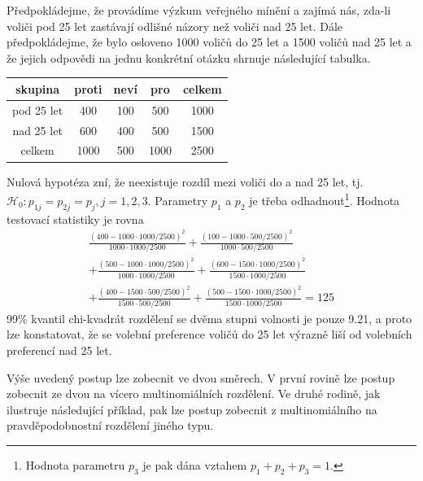 \begin{example}
Předpokládejme, že provádíme výzkum veřejného mínění a zajímá nás, zda-li voliči pod 25 let zastávají odlišné názory než voliči nad 25 let. Dále předpokládejme, že bylo osloveno 1000 voličů do 25 let a 1500 voličů nad 25 let a že jejich odpovědi na jednu konkrétní otázku shrnuje následující tabulka.
\begin{center}
  \begin{tabular}{|c|c|c|c|c|}
    \hline
    \textbf{skupina} & \textbf{proti} & \textbf{neví} & \textbf{pro} & \textbf{celkem}\\
    \hline
    pod 25 let & 400 & 100 & 500 & 1000\\
    nad 25 let & 600 & 400 & 500 & 1500\\
    celkem & 1000 & 500 & 1000 & 2500\\
    \hline
  \end{tabular}
\end{center}
Nulová hypotéza zní, že neexistuje rozdíl mezi voliči do a nad 25 let, tj. $\mathscr{H}_0: p_{1j} = p_{2j} = p_j, j = 1, 2, 3$. Parametry $p_1$ a $ p_2$ je třeba odhadnout\footnote{Hodnota parametru $p_3$ je pak dána vztahem $p_1 + p_2 + p_3 = 1$.}. Hodnota testovací statistiky je rovna
\begin{multline*}
\frac{(400 - 1000 \cdot 1000/2500)^2}{1000 \cdot 1000 / 2500} + \frac{(100 - 1000 \cdot 500/2500)^2}{1000 \cdot 500 / 2500}\\
+\frac{(500 - 1000 \cdot 1000/2500)^2}{1000 \cdot 1000 / 2500} + \frac{(600 - 1500 \cdot 1000/2500)^2}{1500 \cdot 1000 / 2500}\\
+\frac{(400 - 1500 \cdot 500/2500)^2}{1500 \cdot 500 / 2500} + \frac{(500 - 1500 \cdot 1000/2500)^2}{1500 \cdot 1000 / 2500} = 125
\end{multline*}
99\% kvantil chi-kvadrát rozdělení se dvěma stupni volnosti je pouze 9.21, a proto lze konstatovat, že se volební preference voličů do 25 let výrazně liší od volebních preferencí nad 25 let.
\end{example}

Výše uvedený postup lze zobecnit ve dvou směrech. V první rovině lze postup zobecnit ze dvou na vícero multinomiálních rozdělení. Ve druhé rodině, jak ilustruje následující příklad, pak lze postup zobecnit z multinomiálního na pravděpodobnostní rozdělení jiného typu.

